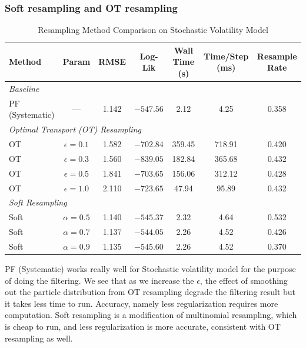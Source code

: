 \documentclass{article}
\begin{document}
\clearpage
\subsubsection{Soft resampling and OT resampling}

\begin{table}[htbp]
\centering
\caption{Resampling Method Comparison on Stochastic Volatility Model}
\begin{tabular}{lcccccc}
\toprule
\textbf{Method} & \textbf{Param} & \textbf{RMSE} & \textbf{Log-Lik} & \textbf{Wall Time (s)} & \textbf{Time/Step (ms)} & \textbf{Resample Rate} \\
\midrule
\multicolumn{7}{l}{\textit{Baseline}} \\
PF (Systematic) & ---    & 1.142 & $-547.56$ & 2.12  & 4.25  & 0.358 \\
\midrule
\multicolumn{7}{l}{\textit{Optimal Transport (OT) Resampling}} \\
OT              & $\epsilon=0.1$ & 1.582 & $-702.84$ & 359.45 & 718.91 & 0.420 \\
OT              & $\epsilon=0.3$ & 1.560 & $-839.05$ & 182.84 & 365.68 & 0.432 \\
OT              & $\epsilon=0.5$ & 1.841 & $-703.65$ & 156.06 & 312.12 & 0.428 \\
OT              & $\epsilon=1.0$ & 2.110 & $-723.65$ & 47.94  & 95.89  & 0.432 \\
\midrule
\multicolumn{7}{l}{\textit{Soft Resampling}} \\
Soft            & $\alpha=0.5$   & 1.140 & $-545.37$ & 2.32  & 4.64  & 0.532 \\
Soft            & $\alpha=0.7$   & 1.137 & $-544.05$ & 2.26  & 4.52  & 0.426 \\
Soft            & $\alpha=0.9$   & 1.135 & $-545.60$ & 2.26  & 4.52  & 0.370 \\
\bottomrule
\end{tabular}
\label{tab:stochastic_volatility_resampling}
\end{table}
PF (Systematic) works really well for Stochastic volatility model for the purpose of doing the filtering. We see that as we increase the $\epsilon$, the effect of smoothing out the particle distribution from OT resampling degrade the filtering result but it takes less time to run. Accuracy, namely less regularization requires more computation. Soft resampling is a modification of multinomial resampling, which is cheap to run, and less regularization is more accurate, consistent with OT resampling as well. 
\end{document}
